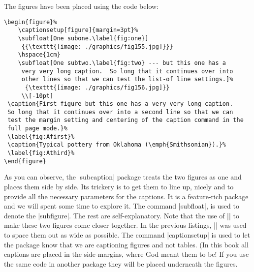 The figures have been placed using the code below:

\begin{verbatim}
\begin{figure}%
    \captionsetup[figure]{margin=3pt}%
    \subfloat[One subone.\label{fig:one}]
     {{\texttt{[image: ./graphics/fig155.jpg]}}}
    \hspace{1cm}
    \subfloat[One subtwo.\label{fig:two} --- but this one has a
     very very long caption.  So long that it continues over into
     other lines so that we can test the list-of line settings.]%
      {\texttt{[image: ./graphics/fig156.jpg]}}
     \\[-10pt]
 \caption{First figure but this one has a very very long caption.
 So long that it continues over into a second line so that we can
 test the margin setting and centering of the caption command in the
 full page mode.}%
 \label{fig:Afirst}%
 \caption{Typical pottery from Oklahoma (\emph{Smithsonian}).}%
 \label{fig:Athird}%
\end{figure}
\end{verbatim}

As you can observe, the |subcaption| package treats the two figures as one and places them side by side. Its trickery is to get them to line up, nicely and to provide all the necessary parameters for the captions. It is a feature-rich package and we will spent some time to explore it. The command |subfloat|, is used to denote the |subfigure|. The rest are self-explanatory. Note that the use of |\hspace{1cm}| to make these two figures come closer together. In the previous listings, |\hfill| was used to space them out as wide as possible. The command |captionsetup| is used to let the package know that we are captioning figures and not tables. (In this book all captions are placed in the side-margins, where God meant them to be! If you use the same code in another package they will be placed underneath the figures.




